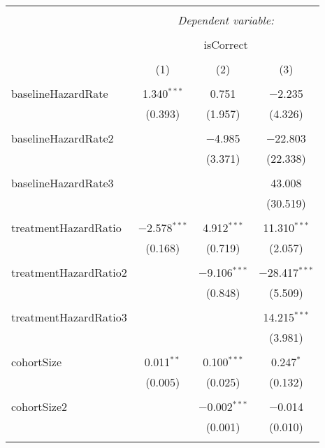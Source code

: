 \begin{table}[!htbp] \centering 
  \caption{} 
  \label{} 
\begin{tabular}{@{\extracolsep{5pt}}lccc} 
\\[-1.8ex]\hline 
\hline \\[-1.8ex] 
 & \multicolumn{3}{c}{\textit{Dependent variable:}} \\ 
\cline{2-4} 
\\[-1.8ex] & \multicolumn{3}{c}{isCorrect} \\ 
\\[-1.8ex] & (1) & (2) & (3)\\ 
\hline \\[-1.8ex] 
 baselineHazardRate & 1.340$^{***}$ & 0.751 & $-$2.235 \\ 
  & (0.393) & (1.957) & (4.326) \\ 
  & & & \\ 
 baselineHazardRate2 &  & $-$4.985 & $-$22.803 \\ 
  &  & (3.371) & (22.338) \\ 
  & & & \\ 
 baselineHazardRate3 &  &  & 43.008 \\ 
  &  &  & (30.519) \\ 
  & & & \\ 
 treatmentHazardRatio & $-$2.578$^{***}$ & 4.912$^{***}$ & 11.310$^{***}$ \\ 
  & (0.168) & (0.719) & (2.057) \\ 
  & & & \\ 
 treatmentHazardRatio2 &  & $-$9.106$^{***}$ & $-$28.417$^{***}$ \\ 
  &  & (0.848) & (5.509) \\ 
  & & & \\ 
 treatmentHazardRatio3 &  &  & 14.215$^{***}$ \\ 
  &  &  & (3.981) \\ 
  & & & \\ 
 cohortSize & 0.011$^{**}$ & 0.100$^{***}$ & 0.247$^{*}$ \\ 
  & (0.005) & (0.025) & (0.132) \\ 
  & & & \\ 
 cohortSize2 &  & $-$0.002$^{***}$ & $-$0.014 \\ 
  &  & (0.001) & (0.010) \\ 
  & & & \\ 

\end{tabular}
\end{table}
